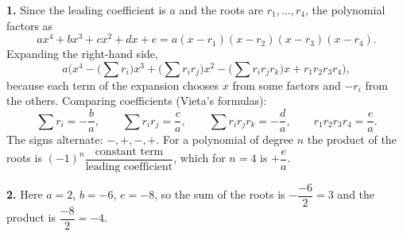 \textbf{1.} Since the leading coefficient is $a$ and the roots are $r_1,\dots,r_4$, the polynomial factors as
\[
ax^4+bx^3+cx^2+dx+e=a(x-r_1)(x-r_2)(x-r_3)(x-r_4).
\]
Expanding the right-hand side,
\[
a\Big(x^4-\big(\textstyle\sum r_i\big)x^3+\big(\sum r_ir_j\big)x^2-\big(\sum r_ir_jr_k\big)x+r_1r_2r_3r_4\Big),
\]
because each term of the expansion chooses $x$ from some factors and $-r_i$ from the others. Comparing coefficients (Vieta's formulas):
\[
\sum r_i=-\dfrac {b}{a},\qquad \sum r_ir_j=\dfrac {c}{a},\qquad \sum r_ir_jr_k=-\dfrac {d}{a},\qquad r_1r_2r_3r_4=\dfrac {e}{a} .
\]
The signs alternate: $-,+,-,+$. For a polynomial of degree $n$ the product of the roots is $(-1)^n\dfrac{\text{constant term}}{\text{leading coefficient}}$, which for $n=4$ is $+\dfrac {e}{a}$.

\textbf{2.} Here $a=2$, $b=-6$, $e=-8$, so the sum of the roots is $-\dfrac{-6}{2}=\boxed{3}$ and the product is $\dfrac{-8}{2}=\boxed{-4}$.
